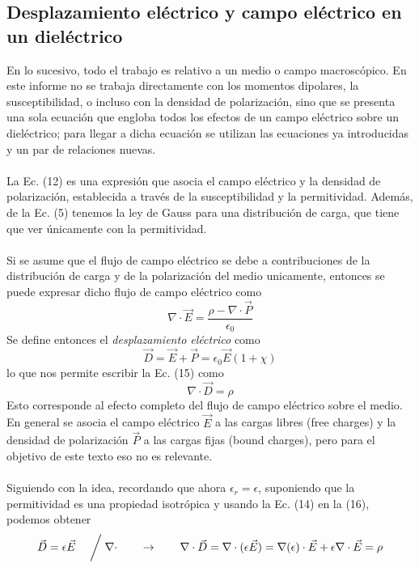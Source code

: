 \documentclass[12pt, notitlepage]{article}
\begin{document}
\subsection{Desplazamiento eléctrico y campo eléctrico en un dieléctrico}
En lo sucesivo, todo el trabajo es relativo a un medio o campo macroscópico. En este informe no se trabaja directamente con los momentos dipolares, la susceptibilidad, o incluso con la densidad de polarización, sino que se presenta una sola ecuación que engloba todos los efectos de un campo eléctrico sobre un dieléctrico; para llegar a dicha ecuación se utilizan las ecuaciones ya introducidas y un par de relaciones nuevas.\\\\
La Ec. (12) es una expresión que asocia el campo eléctrico y la densidad de polarización, establecida a través de la susceptibilidad y la permitividad. Además, de la Ec. (5) tenemos la ley de Gauss para una distribución de carga, que tiene que ver únicamente con la permitividad.\\\\
Si se asume que el flujo de campo eléctrico se debe a contribuciones de la distribución de carga y de la polarización del medio unicamente, entonces se puede expresar dicho flujo de campo eléctrico como
\begin{equation}
\nabla\cdot\vec{E} = \frac{\rho - \nabla\cdot\vec{P}}{\epsilon_0}
\end{equation}
Se define entonces el \textit{desplazamiento eléctrico} como
\begin{equation}
\vec{D} = \vec{E} + \vec{P} = \epsilon_0\vec{E}(1 + \chi)
\end{equation}
lo que nos permite escribir la Ec. (15) como
\begin{equation}
\nabla\cdot\vec{D} = \rho
\end{equation}
Esto corresponde al efecto completo del flujo de campo eléctrico sobre el medio. En general se asocia el campo eléctrico $\vec{E}$ a las cargas libres (free charges) y la densidad de polarización $\vec{P}$ a las cargas fijas (bound charges), pero para el objetivo de este texto eso no es relevante.\\\\
Siguiendo con la idea, recordando que ahora $\epsilon_r = \epsilon$, suponiendo que la permitividad es una propiedad isotrópica y usando la Ec. (14) en la (16), podemos obtener
\begin{equation}
\vec{D} = \epsilon\vec{E}\quad\biggm/\nabla\cdot\qquad\rightarrow\qquad\nabla\cdot\vec{D}=\nabla\cdot(\epsilon\vec{E}) = \nabla(\epsilon)\cdot\vec{E} + \epsilon\nabla\cdot\vec{E} = \rho
\end{equation}
\end{document}
